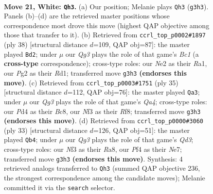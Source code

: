\documentclass[11pt]{article}
\begin{document}
\clearpage

\begin{figure}[p]\centering
\begin{subfigure}{0.46\textwidth}\centering
\resizebox{\linewidth}{!}{%
\newchessgame
\chessboard[
  setfen={rnb1r1k1/2pnq1pp/1p2p3/p2pPp2/3P1P1P/P4NQ1/1PPKN1P1/1R3B1R w - - 3 21},
  showmover=false,
  pgfstyle=straightmove, color=movearrow, markmove={g3-h3}
]}
\caption{}
\end{subfigure}\hfill
\begin{subfigure}{0.46\textwidth}\centering
\resizebox{\linewidth}{!}{%
\newchessgame
\chessboard[
  setfen={r1r2nk1/pp2bpp1/1qn1p2p/3pP3/P2P3P/1P1Q1NP1/2N2PK1/R1BR4 w - - 1 20},
  showmover=false,
  pgfstyle=straightmove, color=movearrow, markmove={c1-d2}
]}
\caption{}
\end{subfigure}
\\[4pt]
\begin{subfigure}{0.46\textwidth}\centering
\resizebox{\linewidth}{!}{%
\newchessgame
\chessboard[
  setfen={r1b2rk1/p4ppp/1n2p3/q2pP3/1ppP1P2/6P1/P1QNN1BP/R3K2R b KQ - 2 18},
  showmover=false,
  pgfstyle=straightmove, color=movearrow, markmove={a5-a3}
]}
\caption{}
\end{subfigure}\hfill
\begin{subfigure}{0.46\textwidth}\centering
\resizebox{\linewidth}{!}{%
\newchessgame
\chessboard[
  setfen={r5k1/1p2nrpp/1npq1p2/p2p4/P2P4/2NQP3/1P1N1PPP/R3R1K1 b - - 1 17},
  showmover=false,
  pgfstyle=straightmove, color=movearrow, markmove={d6-b4}
]}
\caption{}
\end{subfigure}
\caption{\textbf{Move 21, White: \texttt{Qh3}.} (a) Our position; Melanie plays \texttt{Qh3} (\texttt{g3h3}). Panels (b)--(d) are the retrieved master positions whose correspondence most drove this move (highest QAP objective among those that transfer to it). (b) Retrieved from \texttt{ccrl\_top\_p0002\#1897} (ply 38) [structural distance $d$=109, QAP obj=87]: the master played \texttt{Bd2}; under $\mu$ our \emph{Qg3} plays the role of that game's \emph{Bc1} (a \textbf{cross-type} correspondence); cross-type roles: our \emph{N}e2 as their \emph{R}a1, our \emph{P}g2 as their \emph{R}d1; transferred move \texttt{g3h3} \textbf{(endorses this move)}. (c) Retrieved from \texttt{ccrl\_top\_p0003\#1751} (ply 35) [structural distance $d$=112, QAP obj=76]: the master played \texttt{Qa3}; under $\mu$ our \emph{Qg3} plays the role of that game's \emph{Qa4}; cross-type roles: our \emph{P}d4 as their \emph{B}c8, our \emph{N}f3 as their \emph{R}f8; transferred move \texttt{g3h3} \textbf{(endorses this move)}. (d) Retrieved from \texttt{ccrl\_top\_p0000\#3060} (ply 33) [structural distance $d$=126, QAP obj=51]: the master played \texttt{Qb4}; under $\mu$ our \emph{Qg3} plays the role of that game's \emph{Qd3}; cross-type roles: our \emph{N}f3 as their \emph{R}a8, our \emph{P}f4 as their \emph{N}e7; transferred move \texttt{g3h3} \textbf{(endorses this move)}. Synthesis: 4 retrieved analogs transferred to \texttt{Qh3} (summed QAP objective 236, the strongest correspondence among the candidate moves); Melanie committed it via the \texttt{search} selector.}
\label{fig:thought-m40}
\end{figure}
\end{document}
